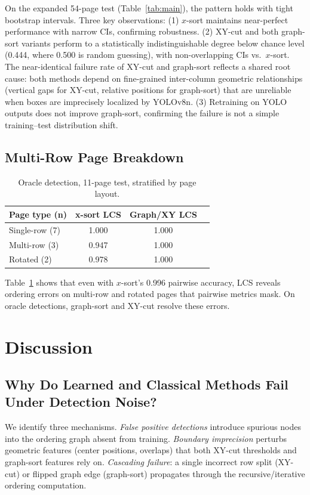 \documentclass[5p,times,twocolumn]{elsarticle}
\begin{document}
On the expanded 54-page test (Table~\ref{tab:main}), the pattern holds with tight bootstrap intervals. Three key observations: (1) $x$-sort maintains near-perfect performance with narrow CIs, confirming robustness. (2) XY-cut and both graph-sort variants perform to a statistically indistinguishable degree below chance level (0.444, where 0.500 is random guessing), with non-overlapping CIs vs.\ $x$-sort. The near-identical failure rate of XY-cut and graph-sort reflects a shared root cause: both methods depend on fine-grained inter-column geometric relationships (vertical gaps for XY-cut, relative positions for graph-sort) that are unreliable when boxes are imprecisely localized by YOLOv8n. (3) Retraining on YOLO outputs does not improve graph-sort, confirming the failure is not a simple training--test distribution shift.

\subsection{Multi-Row Page Breakdown}

\begin{table}[!ht]
\centering
\caption{Oracle detection, 11-page test, stratified by page layout.}
\label{tab:strat}
\scriptsize
\begin{tabular}{lccc}
\toprule
Page type (n) & x-sort LCS & Graph/XY LCS \\
\midrule
Single-row (7) & 1.000 & 1.000 \\
Multi-row (3) & 0.947 & 1.000 \\
Rotated (2) & 0.978 & 1.000 \\
\bottomrule
\end{tabular}
\end{table}

Table~\ref{tab:strat} shows that even with $x$-sort's 0.996 pairwise accuracy, LCS reveals ordering errors on multi-row and rotated pages that pairwise metrics mask. On oracle detections, graph-sort and XY-cut resolve these errors.

\section{Discussion}

\subsection{Why Do Learned and Classical Methods Fail Under Detection Noise?}
We identify three mechanisms. \textit{False positive detections} introduce spurious nodes into the ordering graph absent from training. \textit{Boundary imprecision} perturbs geometric features (center positions, overlaps) that both XY-cut thresholds and graph-sort features rely on. \textit{Cascading failure}: a single incorrect row split (XY-cut) or flipped graph edge (graph-sort) propagates through the recursive/iterative ordering computation.
\end{document}

